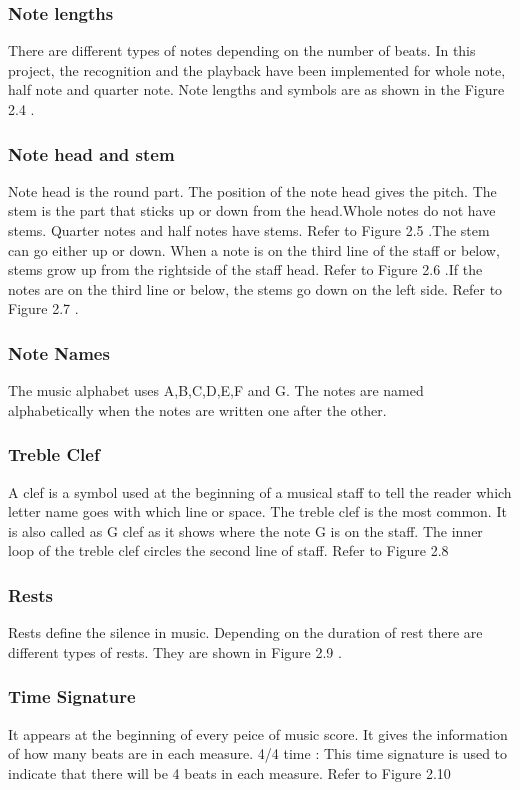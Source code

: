 \documentclass[journal]{IEEEtran}
\begin{document}
\subsubsection{Note lengths}
There are different types of notes depending on the number of beats. In this
project, the recognition and the playback have been implemented for whole note, half note
and quarter note. Note lengths and symbols are as shown in the Figure 2.4 .

\subsubsection{Note head and stem}
Note head is the round part. The position of the note head gives the
pitch. The stem is the part that sticks up or down from the head.Whole notes do not have
stems. Quarter notes and half notes have stems. Refer to Figure 2.5 .The stem can go either up or down. When a note is on the third line of the staff or below, stems
grow up from the rightside of the staff head. Refer to Figure 2.6 .If the notes are on the third line or below, the stems go down on the left side. Refer to Figure
2.7 .

\subsubsection{Note Names}
The music alphabet uses A,B,C,D,E,F and G. The notes are named alphabetically when the notes are written one after the other.

\subsubsection{Treble Clef}
A clef is a symbol used at the beginning of a musical staff to tell the reader which letter name
goes with which line or space. The treble clef is the most common. It is also called as G clef as it
shows where the note G is on the staff. The inner loop of the treble clef circles the second line of
staff. Refer to Figure 2.8

\subsubsection{Rests}
Rests define the silence in music. Depending on the duration of rest there are different types of
rests. They are shown in Figure 2.9 .

\subsubsection{Time Signature}
It appears at the beginning of every peice of music score. It gives the information of how many
beats are in each measure.
4/4 time :
This time signature is used to indicate that there will be 4 beats in each measure. Refer to Figure
2.10
\end{document}
